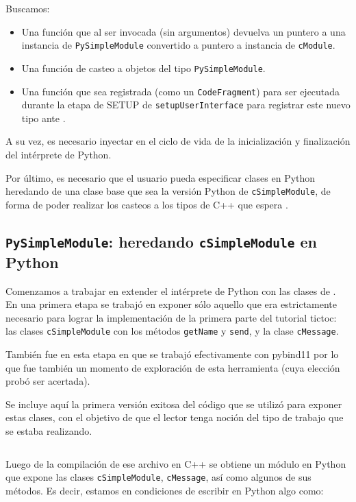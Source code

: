 Buscamos:

\begin{itemize}
    \item Una función que al ser invocada (sin argumentos) devuelva un puntero
a una instancia de \verb!PySimpleModule! convertido a puntero a instancia de
\verb!cModule!.

    \item Una función de casteo a objetos del tipo \verb!PySimpleModule!.

    \item Una función que sea registrada (como un \verb!CodeFragment!) para ser
ejecutada durante la etapa de SETUP de \verb!setupUserInterface! para registrar
este nuevo tipo ante \omnetpp{}. 

\end{itemize}

A su vez, es necesario inyectar en el ciclo de vida de \omnetpp{} la
inicialización y finalización del intérprete de Python.

Por último, es necesario que el usuario pueda especificar clases en Python
heredando de una clase base que sea la versión Python de \verb!cSimpleModule!,
de forma de poder realizar los casteos a los tipos de C++ que espera \omnetpp{}.

\subsection{\texttt{PySimpleModule}: heredando \texttt{cSimpleModule} en Python}

Comenzamos a trabajar en extender el intérprete de Python con las clases de
\omnetpp{}. En una primera etapa se trabajó en exponer sólo aquello que era
estrictamente necesario para lograr la implementación de la primera parte del
tutorial tictoc: las clases \verb!cSimpleModule! con los métodos
\verb!getName! y \verb!send!, y la clase \verb!cMessage!.

También fue en esta etapa en que se trabajó efectivamente con pybind11 por lo
que fue también un momento de exploración de esta herramienta (cuya elección
probó ser acertada).

Se incluye aquí la primera versión exitosa del código que se utilizó para
exponer estas clases, con el objetivo de que el lector tenga noción del tipo de
trabajo que se estaba realizando.

\inputminted{c++}{codelistings/binding.cc}

Luego de la compilación de ese archivo en C++ se obtiene un módulo en Python
que expone las clases \verb!cSimpleModule!, \verb!cMessage!, así como algunos
de sus métodos. Es decir, estamos en condiciones de escribir en Python algo
como:

